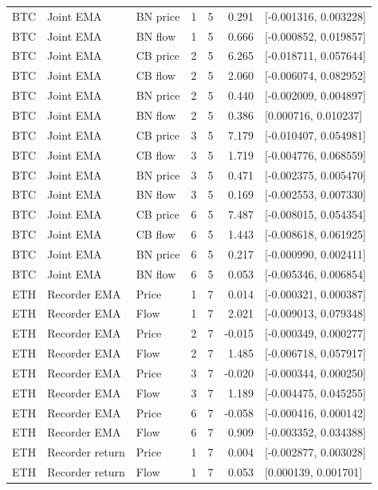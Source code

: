 \begin{longtable}{lllrrrl}
BTC & Joint EMA & BN price & 1 & 5 & 0.291 & [-0.001316, 0.003228]\\
BTC & Joint EMA & BN flow & 1 & 5 & 0.666 & [-0.000852, 0.019857]\\
BTC & Joint EMA & CB price & 2 & 5 & 6.265 & [-0.018711, 0.057644]\\
BTC & Joint EMA & CB flow & 2 & 5 & 2.060 & [-0.006074, 0.082952]\\
BTC & Joint EMA & BN price & 2 & 5 & 0.440 & [-0.002009, 0.004897]\\
BTC & Joint EMA & BN flow & 2 & 5 & 0.386 & [0.000716, 0.010237]\\
BTC & Joint EMA & CB price & 3 & 5 & 7.179 & [-0.010407, 0.054981]\\
BTC & Joint EMA & CB flow & 3 & 5 & 1.719 & [-0.004776, 0.068559]\\
BTC & Joint EMA & BN price & 3 & 5 & 0.471 & [-0.002375, 0.005470]\\
BTC & Joint EMA & BN flow & 3 & 5 & 0.169 & [-0.002553, 0.007330]\\
BTC & Joint EMA & CB price & 6 & 5 & 7.487 & [-0.008015, 0.054354]\\
BTC & Joint EMA & CB flow & 6 & 5 & 1.443 & [-0.008618, 0.061925]\\
BTC & Joint EMA & BN price & 6 & 5 & 0.217 & [-0.000990, 0.002411]\\
BTC & Joint EMA & BN flow & 6 & 5 & 0.053 & [-0.005346, 0.006854]\\
ETH & Recorder EMA & Price & 1 & 7 & 0.014 & [-0.000321, 0.000387]\\
ETH & Recorder EMA & Flow & 1 & 7 & 2.021 & [-0.009013, 0.079348]\\
ETH & Recorder EMA & Price & 2 & 7 & -0.015 & [-0.000349, 0.000277]\\
ETH & Recorder EMA & Flow & 2 & 7 & 1.485 & [-0.006718, 0.057917]\\
ETH & Recorder EMA & Price & 3 & 7 & -0.020 & [-0.000344, 0.000250]\\
ETH & Recorder EMA & Flow & 3 & 7 & 1.189 & [-0.004475, 0.045255]\\
ETH & Recorder EMA & Price & 6 & 7 & -0.058 & [-0.000416, 0.000142]\\
ETH & Recorder EMA & Flow & 6 & 7 & 0.909 & [-0.003352, 0.034388]\\
ETH & Recorder return & Price & 1 & 7 & 0.004 & [-0.002877, 0.003028]\\
ETH & Recorder return & Flow & 1 & 7 & 0.053 & [0.000139, 0.001701]\\

\end{longtable}
